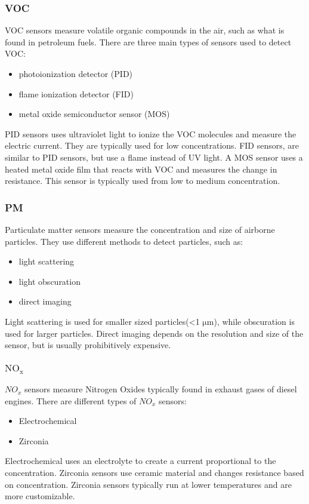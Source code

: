 \subsubsection{VOC}
VOC sensors measure volatile organic compounds in the air, such as what is found in petroleum fuels. There are three main types of sensors used to detect VOC\cite{ourpcb:vocsensor}\cite{utmel:vocsensor}:

\begin{itemize}
	\item photoionization detector (PID)
	\item flame ionization detector (FID)
	\item metal oxide semiconductor sensor (MOS)
\end{itemize}
PID sensors uses ultraviolet light to ionize the VOC molecules and measure the electric current. They are typically used for low concentrations.
FID sensors, are similar to PID sensors, but use a flame instead of UV light.
A MOS sensor uses a heated metal oxide film that reacts with VOC and measures the change in resistance. This sensor is typically used from low to medium concentration.\cite{ourpcb:vocsensor}\cite{utmel:vocsensor} 




\subsubsection{PM}
Particulate matter sensors measure the concentration and size of airborne particles. They use different methods to detect particles, such as:
\begin{itemize}
	\item light scattering
	\item light obscuration
	\item direct imaging
\end{itemize}
Light scattering is used for smaller sized particles(<1 $ \si{\micro\meter} $), while obscuration is used for larger particles\cite{thomasnet:particlesensor}. Direct imaging depends on the resolution and size of the sensor, but is usually prohibitively expensive.

\subsubsection{$\mathrm{NO_x}$}
${NO_x}$ sensors measure Nitrogen Oxides typically found in exhaust gases of diesel engines\cite{autolintec:noxsensor}. There are different types of ${NO_x}$ sensors\cite{drivearchive:noxsensor}:
\begin{itemize}
	\item Electrochemical
	\item Zirconia
\end{itemize}
Electrochemical uses an electrolyte to create a current proportional to the concentration.
Zirconia sensors use ceramic material and changes resistance based on concentration.
Zirconia sensors typically run at lower temperatures and are more customizable.\cite{miura2006electrochemical}


